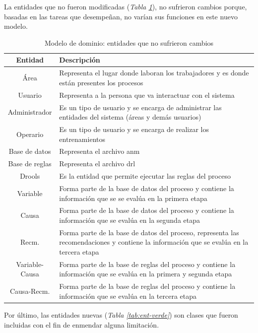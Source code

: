 La entidades que no fueron modificadas (\textsl{Tabla \ref{tab:ent-azul}}),  no sufrieron cambios porque, basadas en las tareas que desempeñan, no varían sus funciones en este nuevo modelo.

\begin{table}[H]
\begin{center}
\begin{tabular}{ | c | p{12cm} | }
\hline
\textbf{Entidad} & \textbf{Descripción} \\
\hline
Área & Representa el lugar donde laboran los trabajadores y es donde están presentes los procesos \\
\hline
Usuario & Representa a la persona que va interactuar con el sistema \\
\hline
Administrador & Es un tipo de usuario y se encarga de administrar las entidades del sistema (áreas y demás usuarios) \\
\hline
Operario & Es un tipo de usuario y se encarga de realizar los entrenamientos \\
\hline
Base de datos & Representa el archivo \textsf{anm} \\
\hline
Base de reglas & Representa el archivo \textsf{drl} \\
\hline
Drools & Es la entidad que permite ejecutar las reglas del proceso \\
\hline
Variable & Forma parte de la base de datos del proceso y contiene la información que se se evalúa en la primera etapa \\
\hline
Causa & Forma parte de la base de datos del proceso y contiene la información que se evalúa en la segunda etapa \\
\hline
Recm. & Forma parte de la base de datos del proceso, representa las recomendaciones y contiene la información que se evalúa en la tercera etapa \\
\hline
Variable-Causa & Forma parte de la base de reglas del proceso y contiene la información que se evalúa en la primera y segunda etapa \\
\hline
Causa-Recm. & Forma parte de la base de reglas del proceso y contiene la información que se evalúa en la tercera etapa \\
\hline
\end{tabular}
\caption{Modelo de dominio: entidades que no sufrieron cambios}
\label{tab:ent-azul}
\end{center}
\end{table}

Por último, las entidades nuevas (\textsl{Tabla \ref{tab:ent-verde}}) son clases que fueron incluidas con el fin de enmendar alguna limitación.

